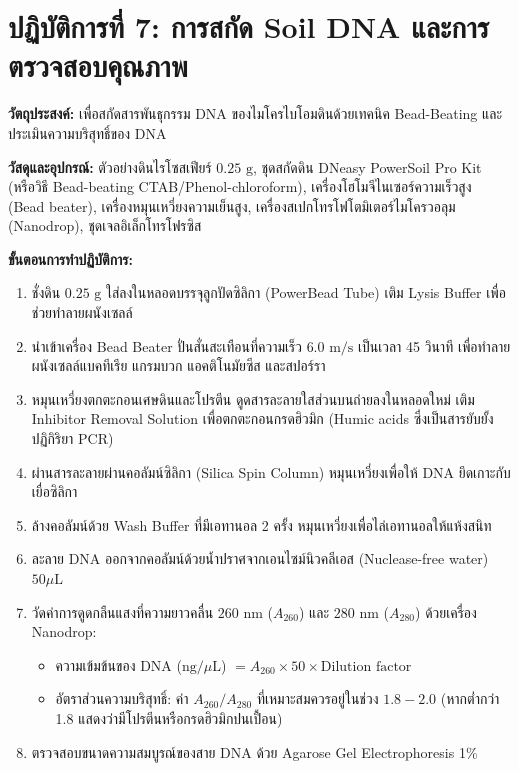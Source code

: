\section{ปฏิบัติการที่ 7: การสกัด Soil DNA และการตรวจสอบคุณภาพ}

\textbf{วัตถุประสงค์:} เพื่อสกัดสารพันธุกรรม DNA ของไมโครไบโอมดินด้วยเทคนิค Bead-Beating และประเมินความบริสุทธิ์ของ DNA

\begin{labprotocol}
\textbf{วัสดุและอุปกรณ์:} ตัวอย่างดินไรโซสเฟียร์ $0.25\text{ g}$, ชุดสกัดดิน DNeasy PowerSoil Pro Kit (หรือวิธี Bead-beating CTAB/Phenol-chloroform), เครื่องโฮโมจีไนเซอร์ความเร็วสูง (Bead beater), เครื่องหมุนเหวี่ยงความเย็นสูง, เครื่องสเปกโทรโฟโตมิเตอร์ไมโครวอลุม (Nanodrop), ชุดเจลอิเล็กโทรโฟรซิส

\textbf{ขั้นตอนการทำปฏิบัติการ:}
\begin{enumerate}
    \item ชั่งดิน $0.25\text{ g}$ ใส่ลงในหลอดบรรจุลูกปัดซิลิกา (PowerBead Tube) เติม Lysis Buffer เพื่อช่วยทำลายผนังเซลล์
    \item นำเข้าเครื่อง Bead Beater ปั่นสั่นสะเทือนที่ความเร็ว $6.0\text{ m/s}$ เป็นเวลา 45 วินาที เพื่อทำลายผนังเซลล์แบคทีเรีย แกรมบวก แอคติโนมัยซีส และสปอร์รา
    \item หมุนเหวี่ยงตกตะกอนเศษดินและโปรตีน ดูดสารละลายใสส่วนบนถ่ายลงในหลอดใหม่ เติม Inhibitor Removal Solution เพื่อตกตะกอนกรดฮิวมิก (Humic acids ซึ่งเป็นสารยับยั้งปฏิกิริยา PCR)
    \item ผ่านสารละลายผ่านคอลัมน์ซิลิกา (Silica Spin Column) หมุนเหวี่ยงเพื่อให้ DNA ยึดเกาะกับเยื่อซิลิกา
    \item ล้างคอลัมน์ด้วย Wash Buffer ที่มีเอทานอล 2 ครั้ง หมุนเหวี่ยงเพื่อไล่เอทานอลให้แห้งสนิท
    \item ละลาย DNA ออกจากคอลัมน์ด้วยน้ำปราศจากเอนไซม์นิวคลีเอส (Nuclease-free water) $50\mu\text{L}$
    \item วัดค่าการดูดกลืนแสงที่ความยาวคลื่น $260\text{ nm}$ ($A_{260}$) และ $280\text{ nm}$ ($A_{280}$) ด้วยเครื่อง Nanodrop:
    \begin{itemize}
        \item ความเข้มข้นของ DNA ($\text{ng/}\mu\text{L}$) $= A_{260} \times 50 \times \text{Dilution factor}$
        \item อัตราส่วนความบริสุทธิ์: ค่า $A_{260}/A_{280}$ ที่เหมาะสมควรอยู่ในช่วง \textbf{$1.8 - 2.0$} (หากต่ำกว่า 1.8 แสดงว่ามีโปรตีนหรือกรดฮิวมิกปนเปื้อน)
    \end{itemize}
    \item ตรวจสอบขนาดความสมบูรณ์ของสาย DNA ด้วย Agarose Gel Electrophoresis 1\%
\end{enumerate}
\end{labprotocol}

